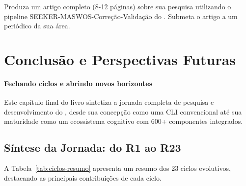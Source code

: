 \begin{exercicio}
    Produza um artigo completo (8-12 páginas) sobre sua pesquisa utilizando
    o pipeline SEEKER-MASWOS-Correção-Validação do \opencodeeco{}. Submeta
    o artigo a um periódico \qualisA{} da sua área.
\end{exercicio}

\section{Conclusão e Perspectivas Futuras}
\label{sec:conclusao-perspectivas}
\nivelphd

\paragraph{Fechando ciclos e abrindo novos horizontes} Este capítulo final do livro sintetiza a jornada completa de pesquisa e
desenvolvimento do \opencodeeco{}, desde sua concepção como uma CLI
convencional até sua maturidade como um ecossistema cognitivo com 600+
componentes integrados.

\subsection{Síntese da Jornada: do R1 ao R23}

A Tabela~\ref{tab:ciclos-resumo} apresenta um resumo dos 23 ciclos evolutivos,
destacando as principais contribuições de cada ciclo.

